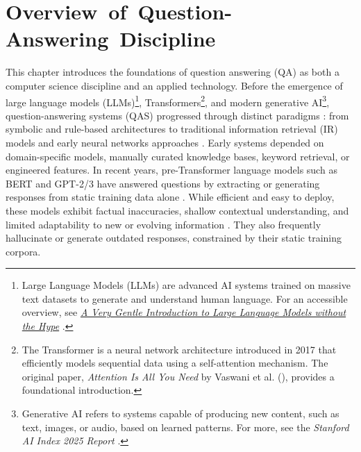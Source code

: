 \chapter{Overview~of~Question-Answering~Discipline}
\label{chap:QAS}
\sloppy
\begin{spacing}{1.5}
\setcounter{table}{0}
This chapter introduces the foundations of question answering (QA) as both a computer science discipline and an applied technology. Before the emergence of large language models (LLMs)\footnote{Large Language Models (LLMs) are advanced AI systems trained on massive text datasets to generate and understand human language. For an accessible overview, see \href{https://mark-riedl.medium.com/a-very-gentle-introduction-to-large-language-models-without-the-hype-5f67941fa59e}{\textit{A Very Gentle Introduction to Large Language Models without the Hype}} \citep{riedl_very_2023}.}, Transformers\footnote{The Transformer is a neural network architecture introduced in 2017 that efficiently models sequential data using a self-attention mechanism. The original paper, \textit{Attention Is All You Need} by Vaswani et al. (\citeyear{vaswani_attention_2017}), provides a foundational introduction.}, and modern generative AI\footnote{Generative AI refers to systems capable of producing new content, such as text, images, or audio, based on learned patterns. For more, see the \textit{Stanford AI Index 2025 Report} \citep{maslej_artificial_2025}.}, question-answering systems (QAS) progressed through distinct paradigms : from symbolic and rule-based architectures to traditional information retrieval (IR) models and early neural networks approaches \citep{jurafsky_chapter_2024,antoniou_survey_2022}. Early systems depended on domain-specific models, manually curated knowledge bases, keyword retrieval, or engineered features. In recent years, pre-Transformer language models such as BERT and GPT-2/3 have answered questions by extracting or generating responses from static training data alone \citep{caballero_brief_2021}. While efficient and easy to deploy, these models exhibit factual inaccuracies, shallow contextual understanding, and limited adaptability to new or evolving information \citep{alanazi_question_2021}. They also frequently hallucinate or generate outdated responses, constrained by their static training corpora.



\end{spacing}
